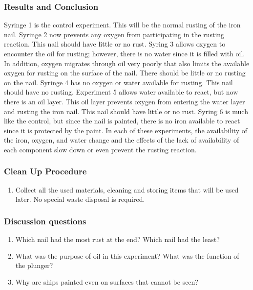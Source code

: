 \subsubsection*{Results and Conclusion}  
Syringe 1 is the control experiment. This will be the normal rusting of the iron nail. Syringe 2 now prevents any oxygen from participating in the rusting reaction. This nail should have little or no rust. Syring 3 allows oxygen to encounter the oil for rusting; however, there is no water since it is filled with oil. In addition, oxygen migrates through oil very poorly that also limits the available oxygen for rusting on the surface of the nail. There should be little or no rusting on the nail. Syringe 4 has no oxygen or water available for rusting. This nail should have no rusting. Experiment 5 allows water available to react, but now there is an oil layer. This oil layer prevents oxygen from entering the water layer and rusting the iron nail. This nail should have little or no rust. Syring 6 is much like the control, but since the nail is painted, there is no iron available to react since it is protected by the paint. In each of these experiments, the availability of the iron, oxygen, and water change and the effects of the lack of availability of each component slow down or even prevent the rusting reaction.
\subsubsection*{Clean Up Procedure}
\begin{enumerate}
\item{Collect all the used materials, cleaning and storing items that will be used later. No special waste disposal is required.}
\end{enumerate}
\subsubsection*{Discussion questions}
\begin{enumerate}
\item{Which nail had the most rust at the end? Which nail had the least?}
\item{What was the purpose of oil in this experiment? What was the function of the plunger?}
\item{Why are ships painted even on surfaces that cannot be seen?}
\end{enumerate}